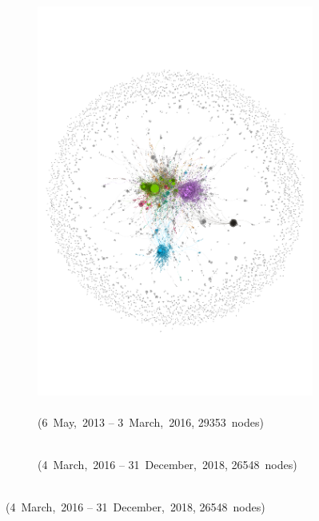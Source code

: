 \documentclass[
  a4paper,
  abstract=on,
  captions=tableabove
  ]{scrartcl}
\begin{document}
\begin{figure}
        \begin{subfigure}{.45\linewidth}
          \caption{\\ (6~May,~2013 -- 3~March,~2016, \num{29353}~nodes)}
          \label{subfig:net_diac_hyperlocal_three}
          \centering
          \includegraphics[width=\linewidth, height=\textheight, keepaspectratio]{img/net_hyperlocal_three.pdf}
        \end{subfigure}
        \begin{subfigure}{.45\linewidth}
          \caption{\\ (4~March,~2016 -- 31~December,~2018, \num{26548}~nodes)}
          \label{subfig:net_diac_hyperlocal_four}
          \centering

\end{subfigure}
\end{figure}
\end{document}
